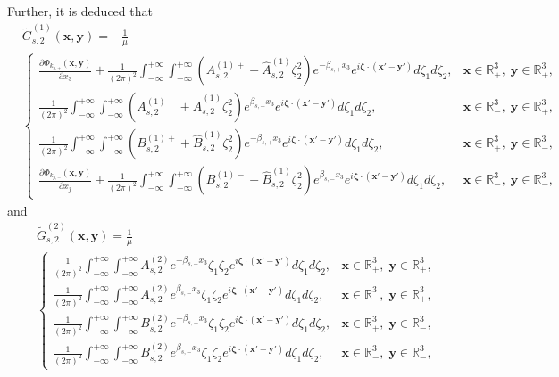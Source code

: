 \documentclass[final,reqno]{siamltex}
\newcommand{\pa}{\partial}
\newcommand{\wid}{\widetilde}
\newcommand{\mat}{\mathbb}
\newcommand{\R}{{\mat R}}
\begin{document}
Further, it is deduced that 
\begin{align*}
&\wid G_{s,2}^{(1)}(\mathbf{x},\mathbf{y})=-\frac{1}{\mu} \\
&\left\{
\begin{array}{ll}
	\displaystyle\frac{\pa\Phi_{k_{p,+}}(\mathbf{x},\mathbf{y})}{\pa x_3}+\frac{1}{(2\pi)^2}\int_{-\infty}^{+\infty}\int_{-\infty}^{+\infty}(A_{s,2}^{(1)+}+\hat A_{s,2}^{(1)}\zeta_2^2)e^{-\beta_{s,+}x_3}e^{i\boldsymbol{\zeta}\cdot(\mathbf{x}'-\mathbf{y}')}d\zeta_1d\zeta_2,&\mathbf{x}\in\R^3_+,\;\mathbf{y}\in\R^3_+,\\
	\displaystyle\frac{1}{(2\pi)^2}\int_{-\infty}^{+\infty}\int_{-\infty}^{+\infty}(A_{s,2}^{(1)-}+\hat A_{s,2}^{(1)}\zeta_2^2)e^{\beta_{s,-}x_3}e^{i\boldsymbol{\zeta}\cdot(\mathbf{x}'-\mathbf{y}')}d\zeta_1d\zeta_2,&\mathbf{x}\in\R^3_-,\;\mathbf{y}\in\R^3_+, \\
	\displaystyle\frac{1}{(2\pi)^2}\int_{-\infty}^{+\infty}\int_{-\infty}^{+\infty}(B_{s,2}^{(1)+}+\hat B_{s,2}^{(1)}\zeta_2^2)e^{-\beta_{s,+}x_3}e^{i\boldsymbol{\zeta}\cdot(\mathbf{x}'-\mathbf{y}')}d\zeta_1d\zeta_2,&\mathbf{x}\in\R^3_+,\;\mathbf{y}\in\R^3_-, \\
	\displaystyle\frac{\pa\Phi_{k_{p,-}}(\mathbf{x},\mathbf{y})}{\pa x_j}+\frac{1}{(2\pi)^2}\int_{-\infty}^{+\infty}\int_{-\infty}^{+\infty}(B_{s,2}^{(1)-}+\hat B_{s,2}^{(1)}\zeta_2^2)e^{\beta_{s,-}x_3}e^{i\boldsymbol{\zeta}\cdot(\mathbf{x}'-\mathbf{y}')}d\zeta_1d\zeta_2,&\mathbf{x}\in\R^3_-,\;\mathbf{y}\in\R^3_-, 
\end{array}
\right.
\end{align*}
and 
\begin{align*}
&\wid G_{s,2}^{(2)}(\mathbf{x},\mathbf{y})=\frac{1}{\mu} \\
&\left\{
\begin{array}{ll}
	\displaystyle\frac{1}{(2\pi)^2}\int_{-\infty}^{+\infty}\int_{-\infty}^{+\infty}A_{s,2}^{(2)}e^{-\beta_{s,+}x_3}\zeta_1\zeta_2e^{i\boldsymbol{\zeta}\cdot(\mathbf{x}'-\mathbf{y}')}d\zeta_1d\zeta_2,&\mathbf{x}\in\R^3_+,\;\mathbf{y}\in\R^3_+,\\
	\displaystyle\frac{1}{(2\pi)^2}\int_{-\infty}^{+\infty}\int_{-\infty}^{+\infty}A_{s,2}^{(2)}e^{\beta_{s,-}x_3}\zeta_1\zeta_2e^{i\boldsymbol{\zeta}\cdot(\mathbf{x}'-\mathbf{y}')}d\zeta_1d\zeta_2,&\mathbf{x}\in\R^3_-,\;\mathbf{y}\in\R^3_+, \\
	\displaystyle\frac{1}{(2\pi)^2}\int_{-\infty}^{+\infty}\int_{-\infty}^{+\infty}B_{s,2}^{(2)}e^{-\beta_{s,+}x_3}\zeta_1\zeta_2e^{i\boldsymbol{\zeta}\cdot(\mathbf{x}'-\mathbf{y}')}d\zeta_1d\zeta_2,&\mathbf{x}\in\R^3_+,\;\mathbf{y}\in\R^3_-, \\
	\displaystyle\frac{1}{(2\pi)^2}\int_{-\infty}^{+\infty}\int_{-\infty}^{+\infty}B_{s,2}^{(2)}e^{\beta_{s,-}x_3}\zeta_1\zeta_2e^{i\boldsymbol{\zeta}\cdot(\mathbf{x}'-\mathbf{y}')}d\zeta_1d\zeta_2,&\mathbf{x}\in\R^3_-,\;\mathbf{y}\in\R^3_-, 
\end{array}
\right.
\end{align*}
\end{document}
